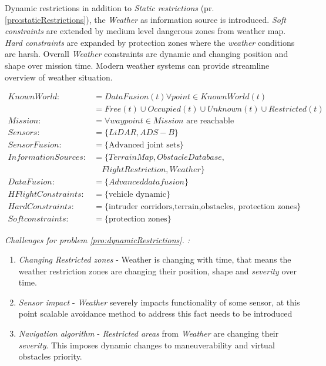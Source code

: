 \begin{problem}{Dynamic restrictions}\label{pro:dynamicRestrictions}
    in addition to \emph{Static restrictions} (pr. \ref{pro:staticRestrictions}), the \emph{Weather} as information source is introduced. \emph{Soft constraints} are extended by medium level dangerous zones from weather map. \emph{Hard constraints} are expanded by protection zones where the \emph{weather} conditions are harsh. Overall \emph{Weather} constraints are dynamic and changing position and shape over mission time. Modern weather systems can provide streamline overview of weather situation. 
    
    \begin{equation}\label{eq:dynamicRestrictionsProblemDefinition}
        \begin{aligned}
            KnownWorld:&= DataFusion(t)\forall point\in KnownWorld(t)\\
                       &=Free(t) \cup Occupied(t) \cup Unknown(t) \cup Restricted(t)\\
            Mission:&= \forall waypoint\in Mission \text{ are reachable}\\
            Sensors:&= \{LiDAR,ADS-B\}\\
            SensorFusion:&= \{\text{Advanced joint sets}\}\\
            InformationSources:&=\{Terrain Map,Obstacle Database,\\
                               &\quad Flight Restriction,Weather\}\\
            DataFusion:&= \{Advanced data fusion\}\\
            HFlightConstraints:&=\{\text{vehicle dynamic}\}\\
            HardConstraints:&=\{\text{intruder corridors,terrain,obstacles, protection zones}\}\\
            Softconstraints:&=\{\text{protection zones}\}
        \end{aligned}
    \end{equation}
    
    \ifproblemchallenge
    \noindent \emph{Challenges for problem  \ref{pro:dynamicRestrictions}. :}
    \begin{enumerate}
        \item \emph{Changing Restricted zones} -  Weather is changing with time, that means the weather restriction zones are changing their position, shape and \emph{severity} over time. 
        \item \emph{Sensor impact} - \emph{Weather} severely impacts functionality of some sensor, at this point scalable avoidance method to address this fact needs to be introduced
        \item \emph{Navigation algorithm} - \emph{Restricted areas} from \emph{Weather} are changing their \emph{severity}. This imposes dynamic changes to maneuverability and virtual obstacles priority. 
    \end{enumerate}
    \fi
\end{problem}

